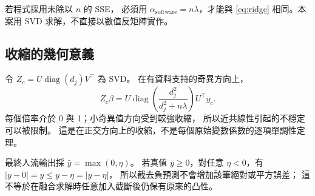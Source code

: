 若程式採用未除以 $n$ 的 SSE，
必須用 $\alpha_{\mathrm{software}}=n\lambda$，才能與
\eqref{eq:ridge} 相同。本案用 SVD 求解，不直接以數值反矩陣實作。

\subsection{收縮的幾何意義}
令 $Z_c=U\operatorname{diag}(d_j)V^\top$ 為 SVD。
在有資料支持的奇異方向上，
\[
Z_c\hat\beta
=U\operatorname{diag}\!\left(\frac{d_j^2}{d_j^2+n\lambda}\right)U^\top y_c .
\]
每個倍率介於 0 與 1；小奇異值方向受到較強收縮，
所以近共線性引起的不穩定可以被限制。
這是在正交方向上的收縮，不是每個原始變數係數的逐項單調性定理。

最終人流輸出採 $\hat y=\max(0,\eta)$。
若真值 $y\ge0$，對任意 $\eta<0$，有
$|y-0|=y\le y-\eta=|y-\eta|$，
所以截去負預測不會增加該筆絕對或平方誤差；
這不等於在融合求解時任意加入截斷後仍保有原來的凸性。
